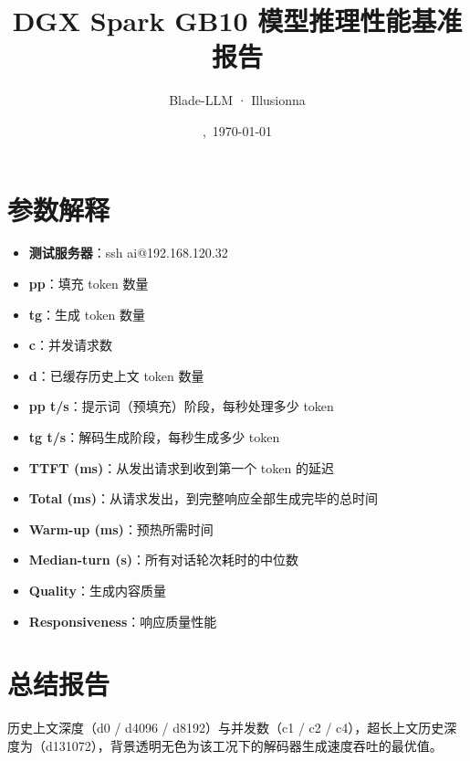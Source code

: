 \documentclass{article}
\title{\textcolor{NavyColor}{\bfseries DGX Spark GB10 模型推理性能基准报告}}
\author{Blade-LLM · Illusionna}
\date{\currenttime,\ \today}
\begin{document}
\maketitle
\thispagestyle{empty}
\tableofcontents
\thispagestyle{empty}
\clearpage
\setcounter{page}{1}



\section{参数解释}

\begin{itemize}
    \item  \textbf{测试服务器}：ssh ai@192.168.120.32
    \item \textbf{pp}：填充 token 数量
    \item \textbf{tg}：生成 token 数量
    \item \textbf{c}：并发请求数
    \item \textbf{d}：已缓存历史上文 token 数量
    \item \textbf{pp t/s}：提示词（预填充）阶段，每秒处理多少 token
    \item \textbf{tg t/s}：解码生成阶段，每秒生成多少 token
    \item \textbf{TTFT (ms)}：从发出请求到收到第一个 token 的延迟
    \item \textbf{Total (ms)}：从请求发出，到完整响应全部生成完毕的总时间
    \item \textbf{Warm-up (ms)}：预热所需时间
    \item \textbf{Median-turn (s)}：所有对话轮次耗时的中位数
    \item \textbf{Quality}：生成内容质量
    \item \textbf{Responsiveness}：响应质量性能
\end{itemize}



\section{总结报告}
历史上文深度（d0 / d4096 / d8192）与并发数（c1 / c2 / c4），超长上文历史深度为（d131072），背景透明无色为该工况下的解码器生成速度吞吐的最优值。
\end{document}
